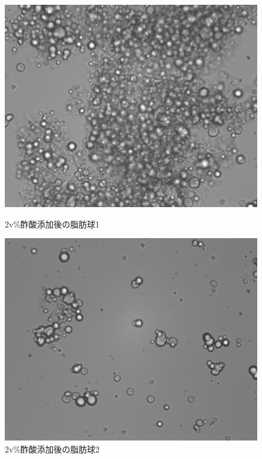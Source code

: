 \documentclass[11pt]{ltjsarticle}
\begin{document}
      \begin{figure}[H]
        \centering
        \begin{minipage}{0.48\textwidth}
          \centering
          \includegraphics[width=\linewidth]{mizumoto_2_1.png}
          \caption{2v\%酢酸添加後の脂肪球1}
          \label{fig:milk2_1}
        \end{minipage}
        \hfill
        \begin{minipage}{0.48\textwidth}
          \centering
          \includegraphics[width=\linewidth]{mizumoto_2_2.png}
          \caption{2v\%酢酸添加後の脂肪球2}
          \label{fig:milk2_2}
        \end{minipage}
      \end{figure}
\end{document}
